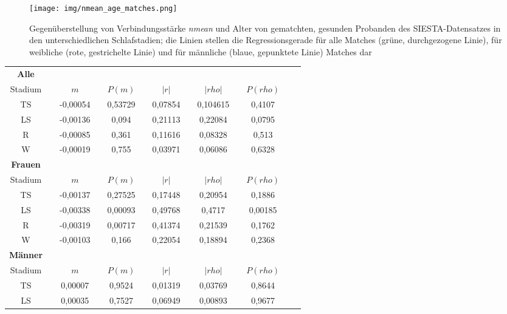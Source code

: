 \begin{figure}[H]
	\centering
	\texttt{[image: img/nmean\_age\_matches.png]}
	\caption[Gegenüberstellung von Verbindungsstärke \textit{nmean} und Alter von gematchten, gesunden Probanden]{Gegenüberstellung von Verbindungsstärke \textit{nmean} und Alter von gematchten, gesunden Probanden des SIESTA-Datensatzes in den unterschiedlichen Schlafstadien; die Linien stellen die Regressionsgerade für alle Matches (grüne, durchgezogene Linie), für weibliche (rote, gestrichelte Linie) und für männliche (blaue, gepunktete Linie) Matches dar}
	\label{fig:nmean_age_matches}
\end{figure}



\begin{table}[H] 
\centering
\begin{tabularx}{0.85\textwidth}{ccccccccccccc}
\toprule
\textbf{Alle} & & & & & & & & & & & &\\  
\cmidrule{1-1}
Stadium & & $m$ & & $P(m)$ & & $|r|$ & & $|rho|$ & & $P(rho)$\\
\midrule
TS & & -0,00054 & & 0,53729 & & 0,07854 & & 0,104615 & & 0,4107\\
LS & & -0,00136 & & 0,094 & & 0,21113 & & 0,22084 & & 0,0795\\
R & & -0,00085 & & 0,361 & & 0,11616 & & 0,08328 & & 0,513\\
W & & -0,00019 & & 0,755 & & 0,03971 & & 0,06086 & & 0,6328\\
\midrule
\textbf{Frauen} & & & & & & & & & & & &\\  
\cmidrule{1-1}
Stadium & & $m$ & & $P(m)$ & & $|r|$ & & $|rho|$ & & $P(rho)$\\
\midrule
TS & & -0,00137 & & 0,27525 & & 0,17448 & & 0,20954 & & 0,1886\\
LS & & -0,00338 & & 0,00093 & & 0,49768 & & 0,4717 & & 0,00185\\
R & & -0,00319 & & 0,00717  & & 0,41374 & & 0,21539 & & 0,1762\\
W & & -0,00103 & & 0,166 & & 0,22054 & & 0,18894 & & 0,2368\\
\midrule
\textbf{Männer} & & & & & & & & & & & &\\  
\cmidrule{1-1}
Stadium & & $m$ & & $P(m)$ & & $|r|$ & & $|rho|$ & & $P(rho)$\\
\midrule
TS & & 0,00007 & & 0,9524 & & 0,01319 & & 0,03769 & & 0,8644\\
LS & & 0,00035 & & 0,7527 & & 0,06949 & & 0,00893 & & 0,9677\\

\end{tabularx}
\end{table}
